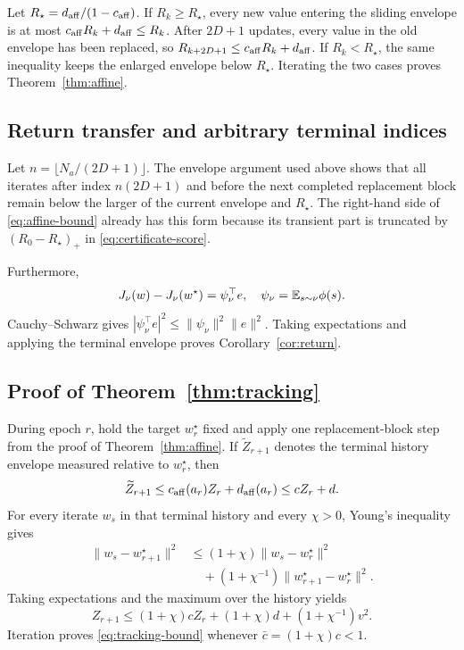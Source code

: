 Let $R_\star=d_{\rm aff}/(1-c_{\rm aff})$.
If $R_k\ge R_\star$, every new value entering the sliding envelope is at most $c_{\rm aff}R_k+d_{\rm aff}\le R_k$.
After $2D+1$ updates, every value in the old envelope has been replaced, so $R_{k+2D+1}\le c_{\rm aff}R_k+d_{\rm aff}$.
If $R_k<R_\star$, the same inequality keeps the enlarged envelope below $R_\star$.
Iterating the two cases proves Theorem~\ref{thm:affine}.

\subsection{Return transfer and arbitrary terminal indices}
Let $n=\lfloor N_a/(2D+1)\rfloor$.
The envelope argument used above shows that all iterates after index $n(2D+1)$ and before the next completed replacement block remain below the larger of the current envelope and $R_\star$.
The right-hand side of \eqref{eq:affine-bound} already has this form because its transient part is truncated by $(R_0-R_\star)_+$ in \eqref{eq:certificate-score}.

Furthermore,
\begin{equation}
J_\nu(w)-J_\nu(w^\star)=\psi_\nu^\top e,
\quad
\psi_\nu=\mathbb{E}_{s\sim\nu}\phi(s).
\end{equation}
Cauchy--Schwarz gives $|\psi_\nu^\top e|^2\le\|\psi_\nu\|^2\|e\|^2$.
Taking expectations and applying the terminal envelope proves Corollary~\ref{cor:return}.

\subsection{Proof of Theorem~\ref{thm:tracking}}
During epoch $r$, hold the target $w_r^\star$ fixed and apply one replacement-block step from the proof of Theorem~\ref{thm:affine}.
If $\widetilde Z_{r+1}$ denotes the terminal history envelope measured relative to $w_r^\star$, then
\begin{equation}
\widetilde Z_{r+1}\le c_{\rm aff}(a_r)Z_r+d_{\rm aff}(a_r)\le cZ_r+d.
\label{eq:tracking-old-target}
\end{equation}
For every iterate $w_s$ in that terminal history and every $\chi>0$, Young's inequality gives
\begin{align}
\|w_s-w_{r+1}^\star\|^2
&\le(1+\chi)\|w_s-w_r^\star\|^2\nonumber\\
&\quad +(1+\chi^{-1})\|w_{r+1}^\star-w_r^\star\|^2.
\end{align}
Taking expectations and the maximum over the history yields
\begin{equation}
Z_{r+1}\le (1+\chi)cZ_r+(1+\chi)d+(1+\chi^{-1})v^2.
\end{equation}
Iteration proves \eqref{eq:tracking-bound} whenever $\bar c=(1+\chi)c<1$.

